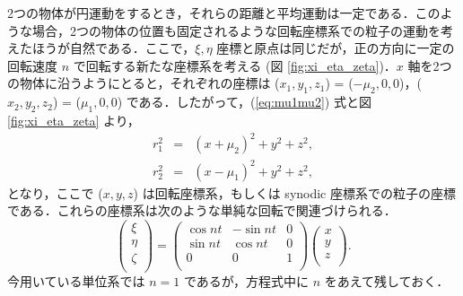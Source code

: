 \documentclass[11pt,a4paper,oneside,onecolumn]{jreport}
\begin{document}
2つの物体が円運動をするとき，それらの距離と平均運動は一定である．このような場合，2つの物体の位置も固定されるような回転座標系での粒子の運動を考えたほうが自然である．ここで，$\xi, \eta$ 座標と原点は同じだが，正の方向に一定の回転速度 $n$ で回転する新たな座標系を考える (図 \ref{fig:xi_eta_zeta})．$x$ 軸を2つの物体に沿うようにとると，それぞれの座標は ($x_1, y_1,z_1$) = ($- \mu_2, 0, 0$)，($x_2, y_2, z_2$) = ($\mu_1, 0, 0$) である．したがって，(\ref{eq:mu1mu2}) 式と図 \ref{fig:xi_eta_zeta} より，
\begin{eqnarray}
r_1^2 & = & (x + \mu_2)^2 + y^2 + z^2,\\
r_2^2 & = & (x - \mu_1)^2 + y^2 + z^2,
\end{eqnarray}
となり，ここで ($x, y, z$) は回転座標系，もしくは synodic 座標系での粒子の座標である．これらの座標系は次のような単純な回転で関連づけられる．
\begin{equation}
\begin{pmatrix}
\xi\\
\eta\\
\zeta\\
\end{pmatrix}
= 
\begin{pmatrix}
\cos nt & - \sin nt & 0\\
\sin nt & \cos nt & 0\\
0 & 0 & 1\\
\end{pmatrix}
\begin{pmatrix}
x\\
y\\
z\\
\end{pmatrix}. \label{eq:xi_eta_zeta_x_y_z}
\end{equation}
今用いている単位系では $n = 1$ であるが，方程式中に $n$ をあえて残しておく．
\end{document}
